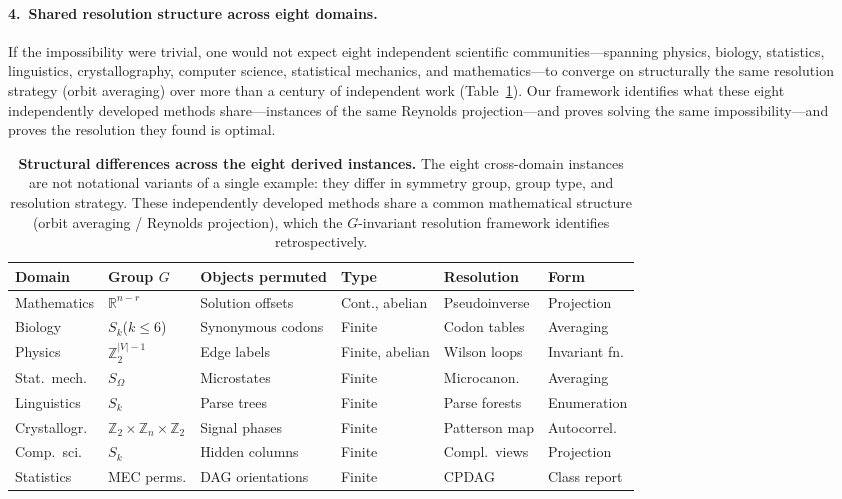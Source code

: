 \documentclass[11pt,a4paper]{article}
\newcommand{\R}{\mathbb{R}}
\begin{document}
\paragraph{4.\ Shared resolution structure across eight domains.}
If the impossibility were trivial, one would not expect eight independent
scientific communities---spanning physics, biology, statistics, linguistics,
crystallography, computer science, statistical mechanics, and
mathematics---to converge on structurally the same resolution strategy
(orbit averaging) over more than a century of independent work
(Table~\ref{tab:structural-differences}).
Our framework identifies what these eight independently developed methods
share---instances of the same Reynolds projection---and proves
solving the same impossibility---and proves the resolution they found is
optimal.

\begin{table}[t]
\centering
\caption{\textbf{Structural differences across the eight derived instances.}
  The eight cross-domain instances are not notational variants of a single
  example: they differ in symmetry group, group type, and resolution strategy.
  These independently developed methods share a common mathematical
  structure (orbit averaging / Reynolds projection), which the
  $G$-invariant resolution framework identifies retrospectively.}
\label{tab:structural-differences}
\small
\setlength{\tabcolsep}{3pt}
\begin{tabular}{@{}llllll@{}}
\toprule
Domain & Group $G$ & Objects permuted & Type & Resolution & Form \\
\midrule
Mathematics
  & $\R^{n-r}$
  & Solution offsets
  & Cont., abelian
  & Pseudoinverse
  & Projection \\[2pt]
Biology
  & $S_k$\;($k{\leq}6$)
  & Synonymous codons
  & Finite
  & Codon tables
  & Averaging \\[2pt]
Physics
  & $\mathbb{Z}_2^{|V|-1}$
  & Edge labels
  & Finite, abelian
  & Wilson loops
  & Invariant fn. \\[2pt]
Stat.\ mech.
  & $S_\Omega$
  & Microstates
  & Finite
  & Microcanon.
  & Averaging \\[2pt]
Linguistics
  & $S_k$
  & Parse trees
  & Finite
  & Parse forests
  & Enumeration \\[2pt]
Crystallogr.
  & $\mathbb{Z}_2{\times}\mathbb{Z}_n{\times}\mathbb{Z}_2$
  & Signal phases
  & Finite
  & Patterson map
  & Autocorrel. \\[2pt]
Comp.\ sci.
  & $S_k$
  & Hidden columns
  & Finite
  & Compl.\ views
  & Projection \\[2pt]
Statistics
  & MEC perms.
  & DAG orientations
  & Finite
  & CPDAG
  & Class report \\
\bottomrule
\end{tabular}
\end{table}
\end{document}
